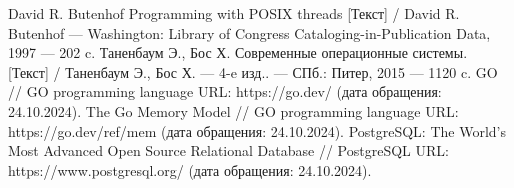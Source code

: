 \begin{thebibliography}{}
     David R. Butenhof Programming with POSIX threads [Текст] / David R. Butenhof — Washington: Library of Congress Cataloging-in-Publication Data, 1997 — 202 c.
     Таненбаум Э., Бос Х. Современные операционные системы. [Текст] / Таненбаум Э., Бос Х. — 4-e изд.. — СПб.: Питер, 2015 — 1120 c.
     GO // GO programming language URL: https://go.dev/ (дата обращения: 24.10.2024).
	 The Go Memory Model // GO programming language URL: https://go.dev/ref/mem (дата обращения: 24.10.2024).
	 PostgreSQL: The World's Most Advanced Open Source Relational Database // PostgreSQL URL: https://www.postgresql.org/ (дата обращения: 24.10.2024).
\end{thebibliography}